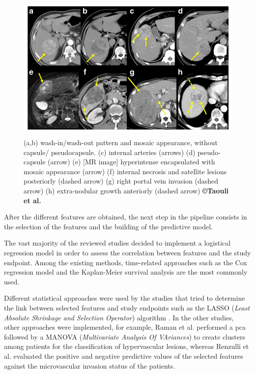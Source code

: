 \begin{figure}[ht!]
\centering
\includegraphics[width=4.67498in,height=2.86979in]{./images/image8.png}
\caption{
(a,b) wash-in/wash-out pattern and mosaic appearance, without capsule/
pseudocapsule.
(c) internal arteries (arrows)
(d) pseudo-capsule (arrow)
(e) {[}MR image{]} hyperintense encapsulated with mosaic appearance
(arrow)
(f) internal necrosis and satellite lesions posteriorly (dashed arrow)
(g) right portal vein invasion (dashed arrow)
(h) extra-nodular growth anteriorly (dashed arrow)
\textbf{©Taouli et al.} \cite{Taouli2017}
}
\label{Taouli_imagingTraits}
\end{figure}


After the different features are obtained, the next step in the pipeline
consists in the selection of the features and the building of the
predictive model.

The vast majority of the reviewed studies decided to implement a
logistical regression model in order to assess the correlation between
features and the study endpoint. Among the existing methods,
time-related approaches such as the Cox regression model \cite{Li2016,Banerjee2015,Zheng2018,Cozzi2017,Xia2018} and the Kaplan-Meier survival analysis
\cite{Segal2007,Chen2017,Akai2018,Xia2018} are the most commonly used.

Different statistical approaches were used by the studies that tried to
determine the link between selected features and study endpoints such as
the LASSO (\emph{Least Absolute Shrinkage and Selection Operator})
algorithm \cite{Zhou2017a,Peng2018,Bakr2017}. In the other studies, other
approaches were implemented, for example, Raman et al.
performed a \ac{pca} followed by a
MANOVA (\emph{Multivariate Analysis Of VAriances}) to create clusters
among patients for the classification of hypervascular lesions, whereas
Renzulli et al. evaluated the positive and negative predictive
values of the selected features against the microvascular invasion
status of the patients.

